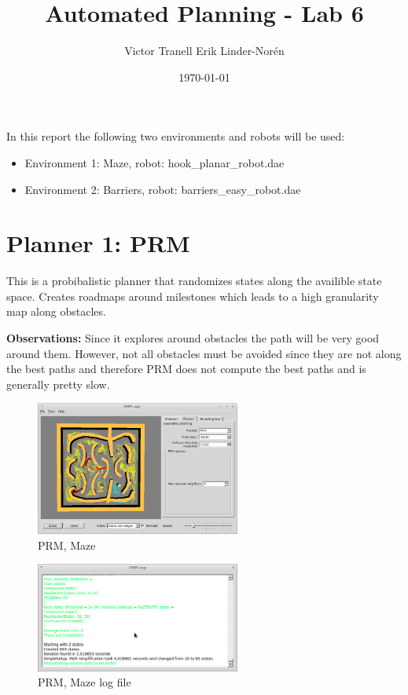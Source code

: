 \documentclass[a4paper]{article}
\title{Automated Planning - Lab 6}
\author{Victor Tranell Erik Linder-Norén}
\date{\today}
\begin{document}
\maketitle
In this report the following two environments and robots will be used:
\begin{itemize}
    \item Environment 1: Maze, robot: hook\_planar\_robot.dae
    \item Environment 2: Barriers, robot: barriers\_easy\_robot.dae
\end{itemize}

\section*{Planner 1: PRM}
This is a probibalistic planner that randomizes states along the availible state space. Creates roadmaps around milestones which leads to a high granularity map along obstacles.

\textbf{Observations:}
Since it explores around obstacles the path will be very good around them. However, not all obstacles must be avoided since they are not along the best paths and therefore PRM does not compute the best paths and is generally pretty slow.

\begin{figure}[H]
     \centering
     \includegraphics[width=0.6\textwidth]{prm_maze.png}
     \caption{PRM, Maze}
     \label{signals}
\end{figure}

\begin{figure}[H]
     \centering
     \includegraphics[width=0.6\textwidth]{prm_maze_log.png}
     \caption{PRM, Maze log file}
     \label{signals}
\end{figure}
\end{document}
